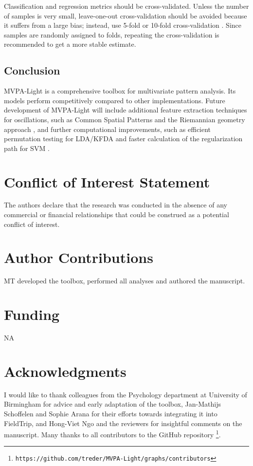 \documentclass[utf8]{frontiersSCNS} %
\newcommand{\ttt}[1]{\texttt{#1}}
\begin{document}
Classification and regression metrics should be cross-validated. Unless the number of samples is very small, leave-one-out cross-validation should be avoided because it suffers from a large bias; instead, use 5-fold or 10-fold cross-validation  \citep{James2013}. Since samples are randomly assigned to folds, repeating the cross-validation is recommended to get a more stable estimate.

\subsection{Conclusion}

MVPA-Light is a comprehensive toolbox for multivariate pattern analysis. Its models perform competitively compared to other implementations. Future development of MVPA-Light will include additional feature extraction techniques for oscillations, such as Common Spatial Patterns \citep{Blankertz2008a} and the Riemannian geometry approach \citep{Barachant2013}, and further computational improvements, such as efficient permutation testing for LDA/KFDA \citep{Treder2019DirectFDA} and faster calculation of the regularization path for SVM \citep{Hastie2004TheMachine}.

\section*{Conflict of Interest Statement}

The authors declare that the research was conducted in the absence of any commercial or financial relationships that could be construed as a potential conflict of interest.

\section*{Author Contributions}

MT developed the toolbox, performed all analyses and authored the manuscript.

\section*{Funding}
NA

\section*{Acknowledgments}
I would like to thank colleagues from the Psychology department at University of Birmingham for advice and early adaptation of the toolbox, Jan-Mathijs Schoffelen and Sophie Arana for their efforts towards integrating it into FieldTrip, and Hong-Viet Ngo and the  reviewers for insightful comments on the manuscript. Many thanks to all contributors to the GitHub repository
\footnote{\ttt{https://github.com/treder/MVPA-Light/graphs/contributors}}.
\end{document}
